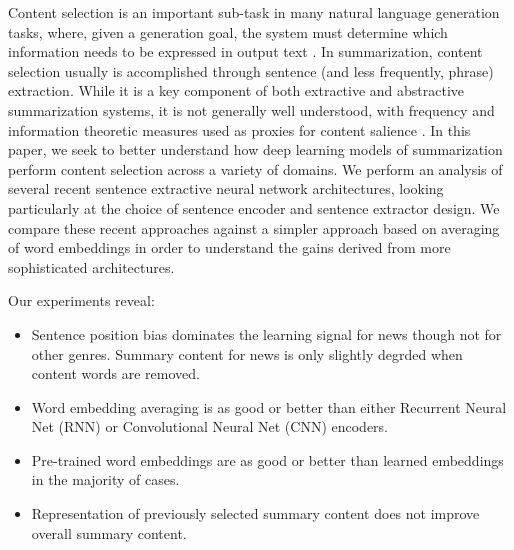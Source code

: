 Content selection is an important sub-task in many natural language generation
tasks,
where, given a generation goal, the system must determine which information
needs to be expressed in output text \cite{gatt2018survey}.
In summarization, content selection usually is accomplished through sentence (and
less frequently, phrase) extraction.
 While it is a key component of both
extractive and abstractive summarization systems, it is not generally well 
understood, with frequency and information theoretic measures used as proxies
for content salience \cite{hong2014improving}. 
In this paper, we seek to better understand how deep learning models of 
summarization perform content selection across a variety of domains.
We perform an analysis 
of several recent sentence extractive neural network architectures, 
looking particularly at the choice of sentence encoder and sentence 
extractor design. We compare these recent approaches  against
a simpler approach based on averaging of word embeddings in order to understand
the gains derived from more sophisticated architectures.



Our experiments reveal:
\begin{itemize}
\item Sentence position bias dominates the learning signal for news though not for
other genres. Summary content for news is only slightly degrded when content words
are removed. 
\item Word embedding averaging is as good or better than either Recurrent Neural Net (RNN) or Convolutional Neural Net (CNN) encoders.
\item Pre-trained word embeddings are as good or better than learned embeddings in the majority of cases.
\item Representation of previously selected summary content does not improve overall summary content. 
\end{itemize} 

